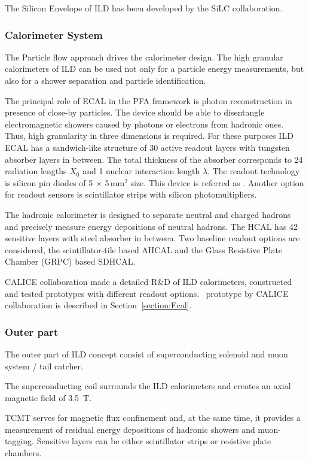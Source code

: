 The Silicon Envelope of ILD has been developed by the SiLC collaboration.

\subsubsection{Calorimeter System}

The Particle flow approach drives the calorimeter design. The high granular calorimeters of ILD can be used not only for a particle energy measurements, but also for a shower separation and particle identification. 

The principal role of ECAL in the PFA framework is photon reconstruction in presence of close-by particles. The device should be able to disentangle electromagnetic showers caused by photons or electrons from hadronic ones. Thus, high granularity in three dimensions is required. For these purposes ILD ECAL has a sandwich-like structure of 30 active readout layers with tungsten absorber layers in between. The total thickness of the absorber corresponds to 24 radiation lengths $X_0$ and 1 nuclear interaction length $\lambda$. The readout technology is silicon pin diodes of 5 $\times$ 5\,mm$^2$ size. This device is referred as \ecal. Another option for readout sensors is scintillator strips with silicon photomultipliers.

The hadronic calorimeter is designed to separate neutral and charged hadrons and precisely measure energy depositions of neutral hadrons. The HCAL has 42 sensitive layers with steel absorber in between. Two baseline readout options are considered, the scintillator-tile based AHCAL and the Glass Resistive Plate Chamber (GRPC) based SDHCAL.

CALICE collaboration made a detailed R\&D of ILD calorimeters, constructed and tested prototypes with different readout options. 
\ecal\ prototype by CALICE collaboration is described in Section~\ref{section:Ecal}.


\subsubsection{Outer part}

The outer part of ILD concept consist of superconducting solenoid and muon system / tail catcher. 

The superconducting coil surrounds the ILD calorimeters and creates an axial magnetic field of 3.5~T.

TCMT serves for magnetic flux confinement and, at the same time, it provides a measurement of residual energy depositions of hadronic showers and muon-tagging. Sensitive layers can be either scintillator strips or resistive plate chambers. 


